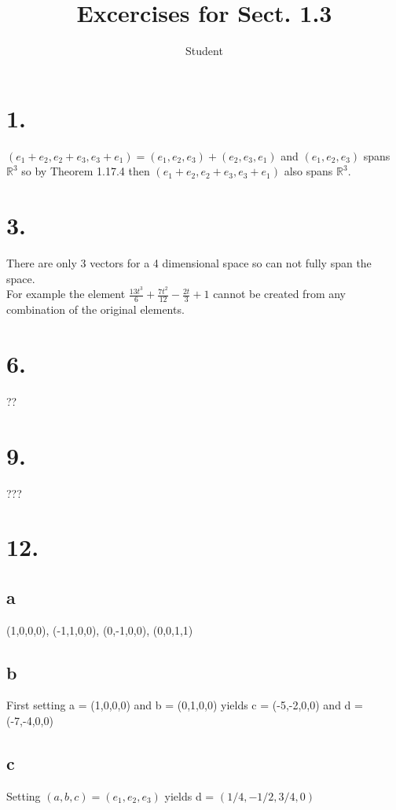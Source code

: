 \documentclass{article}
\title{Excercises for Sect. 1.3}
\author{Student}
\begin{document}
\maketitle
\section*{1.}
$(e_1 + e_2, e_2+e_3,e_3+e_1) = (e_1, e_2, e_3) + (e_2, e_3,e_1)$ and $(e_1, e_2, e_3)$ spans $\mathbb{R}^3$ so by Theorem 1.17.4 then 
$(e_1 + e_2, e_2+e_3,e_3+e_1)$ also spans $\mathbb{R}^3$.\\
\section*{3.}
There are only 3 vectors for a 4 dimensional space so can not fully span the space.\\
For example the element $\frac{13t^3}{6} + \frac{7t^2}{12} - \frac{2t}{3} + 1$ cannot be created from any combination of the original elements.
\section*{6.}
??
\section*{9.}
???
\section*{12.}
\subsection*{a}
{(1,0,0,0), (-1,1,0,0), (0,-1,0,0), (0,0,1,1)}
\subsection*{b}
First setting a = (1,0,0,0) and b = (0,1,0,0) yields c = (-5,-2,0,0) and d = (-7,-4,0,0)
\subsection*{c}
Setting $(a,b,c) = (e_1,e_2,e_3)$ yields d = $(1/4,-1/2,3/4,0)$ 
\end{document}
